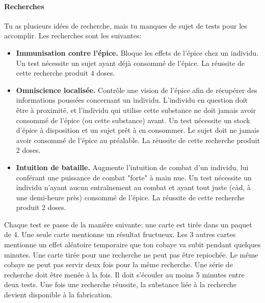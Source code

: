 {	
	\paragraph{Recherches} Tu as plusieurs idées de recherche, mais tu manques de sujet de tests pour les accomplir. Les recherches sont les suivantes:
	\begin{itemize}
		\item \textbf{Immunisation contre l'épice.} Bloque les effets de l'épice chez un individu. Un test nécessite un sujet ayant déjà consommé de l'épice. La réussite de cette recherche produit 4 doses.
		
		\item \textbf{Omniscience localisée.} Contrôle une vision de l'épice afin de récupérer des informations poussées concernant un individu. L'individu en question doit être à proximité, et l'individu qui utilise cette substance ne doit jamais avoir consommé de l'épice (ou cette substance) avant. Un test nécessite un stock d'épice à disposition et un sujet prêt à en consommer. Le sujet doit ne jamais avoir consommé de l'épice au préalable. La réussite de cette recherche produit 2 doses.
		
		\item \textbf{Intuition de bataille.} Augmente l'intuition de combat d'un individu, lui conférant une puissance de combat "forte" à main nue. Un test nécessite un individu n'ayant aucun entraînement au combat et ayant tout juste (càd, à une demi-heure près) consommé de l'épice. La réussite de cette recherche produit 2 doses.
	\end{itemize}
	
	\par Chaque test se passe de la manière suivante: une carte est tirée dans un paquet de 4. Une seule carte mentionne un résultat fructueux. Les 3 autres cartes mentionne un effet aléatoire temporaire que ton cobaye va subit pendant quelques minutes. Une carte tirée pour une recherche ne peut pas être repiochée. Le même cobaye ne peut pas servir deux fois pour la même recherche. Une série de recherche doit être menée à la fois. Il doit s'écouler au moins 5 minutes entre deux tests. Une fois une recherche réussite, la substance liée à la recherche devient disponible à la fabrication.
}




